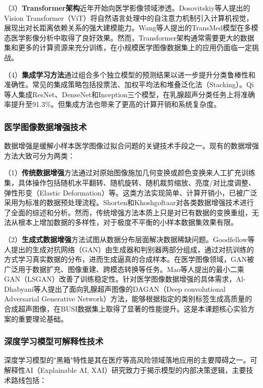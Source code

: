 （3）\textbf{Transformer架构}近年开始向医学影像领域渗透。Dosovitskiy等人\cite{dosovitskiy2020image}提出的Vision Transformer（ViT）将自然语言处理中的自注意力机制引入计算机视觉，展现出对长距离依赖关系的强大建模能力。Wang等人提出的TransMed模型在多模态医学影像分析中取得了良好效果。然而，Transformer架构通常需要更大的数据集和更多的计算资源来充分训练，在小规模医学图像数据集上的应用仍面临一定挑战。

（4）\textbf{集成学习方法}通过组合多个独立模型的预测结果以进一步提升分类鲁棒性和准确性。常见的集成策略包括投票法、加权平均法和堆叠泛化法（Stacking）。Qi等人\cite{qi2019ensemble}集成ResNet、DenseNet和Inception三个模型，在乳腺超声分类任务上将准确率提升至91.3\%。但集成方法也带来了更高的计算开销和系统复杂度。

\subsubsection{医学图像数据增强技术}

数据增强是缓解小样本医学图像过拟合问题的关键技术手段之一。现有的数据增强方法大致可分为两类：

（1）\textbf{传统数据增强}方法通过对原始图像施加几何变换或颜色变换来人工扩充训练集，具体操作包括随机水平翻转、随机旋转、随机裁剪缩放、亮度/对比度调整、弹性形变（Elastic Deformation）等。这类方法实现简单、计算开销小，已被广泛采用为标准的数据预处理流程。Shorten和Khoshgoftaar\cite{shorten2019survey}对各类数据增强技术进行了全面的综述和分析。然而，传统增强方法本质上只是对已有数据的变换重组，无法从根本上增加数据的多样性，对于极度不平衡的小样本数据集效果有限。

（2）\textbf{生成式数据增强}方法试图从数据分布层面解决数据稀缺问题。Goodfellow等人\cite{goodfellow2014generative}提出的生成对抗网络（GAN）由生成器和判别器两部分组成，通过对抗训练的方式学习真实数据的分布，进而生成逼真的合成样本。在医学图像领域，GAN被广泛用于数据扩充、图像重建、跨模态转换等任务。Mao等人\cite{mao2017least}提出的最小二乘GAN（LSGAN）改善了训练稳定性。针对医学图像数据增强的具体需求，Al-Dhabyani等人\cite{aldhabyani2020dataset}提出了面向乳腺超声图像的DAGAN（Deep convolutional Adversarial Generative Network）方法，能够根据指定的类别标签生成高质量的合成超声图像，在BUSI数据集上取得了显著的性能提升。这是本课题核心实验方案的重要理论基础。

\subsubsection{深度学习模型可解释性技术}

深度学习模型的"黑箱"特性是其在医疗等高风险领域落地应用的主要障碍之一。可解释性AI（Explainable AI, XAI）研究致力于揭示模型的内部决策逻辑，主要技术路线包括：

